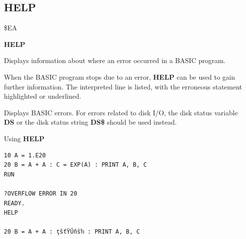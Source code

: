 
\newpage
\subsection{HELP}
\begin{description}[leftmargin=2cm,style=nextline]
\item [Token:]    \$EA

\item [Format:]   {\bf HELP}

\item [Usage:]    Displays information about where an error occurred in a BASIC program.

                  When the BASIC program stops due to an error, {\bf HELP} can be used to gain further information. The interpreted line is listed, with the erroneous statement highlighted or underlined.

\item [Remarks:]  Displays BASIC errors. For errors related to disk I/O, the disk status variable {\bf DS} or the disk status string {\bf DS\$} should be used instead.

\item [Example:]  Using {\bf HELP}

\begin{tcolorbox}[colback=black,coltext=white]
\verbatimfont{\codefont}
\begin{verbatim}
10 A = 1.E20
20 B = A + A : C = EXP(A) : PRINT A, B, C
RUN

?OVERFLOW ERROR IN 20
READY.
HELP

20 B = A + A : ţŝťŸŰňšŉ : PRINT A, B, C
\end{verbatim}
\end{tcolorbox}
\end{description}


\newpage
